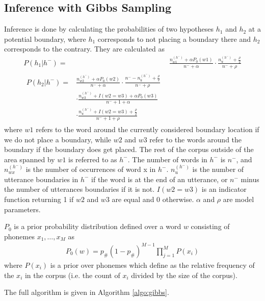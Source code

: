 \documentclass[11pt]{article}
\begin{document}
\subsection{Inference with Gibbs Sampling}
\FloatBarrier
Inference is done by calculating the probabilities of two hypotheses $h_1$ and
$h_2$ at a potential boundary, where $h_1$ corresponds to not placing a
boundary there and $h_2$ corresponds to the contrary.
They are calculated as
\begin{align}
  P(h_1 | h^-) =& \frac{n_{w1}^{(h^-)} + \alpha P_0(w1)}{n^- + \alpha} \cdot
                 \frac{n_u^{(h^-)} + \frac{\rho}{2}}{n^- + \rho}
                  \label{eq:h1} \\
  \begin{split}
  P(h_2 | h^-) =& \frac{n_{w2}^{(h^-)} + \alpha P_0(w2)}{n^- + \alpha}
                  \cdot \frac{n^- - n_\$^{(h^-)} + \frac{\rho}{2}}{n^- + \rho} \\
                & \cdot \frac{n_{w3}^{(h^-)} + I(w2 = w3) + \alpha P_0(w3)}{n^-
                  + 1 + \alpha} \\
                & \cdot \frac{n_u^{(h^-)} + I(w2 = w3) + \frac{\rho}{2}}{n^- + 1 + \rho}
                \label{eq:h2}
  \end{split}
\end{align}
where $w1$ refers to the word around the currently considered boundary location
if we do not place a boundary, while $w2$ and $w3$ refer to the words around the
boundary if the boundary does get placed. The rest of the corpus outside of the
area spanned by $w1$ is referred to as $h^-$. The number of words in $h^-$ is
$n^-$, and $n_{wx}^{(h^-)}$ is the number of occurrences of word x in $h^-$.
$n_u^{(h^-)}$ is the number of utterance boundaries in $h^-$ if the word is at
the end of an utterance, or $n^-$ minus the number of utterances boundaries if
it is not. $I(w2 = w3)$ is an indicator function returning 1 if $w2$ and $w3$
are equal and 0 otherwise. $\alpha$ and $\rho$ are model parameters.

$P_0$ is a prior probability distribution defined over a word $w$ consisting of
phonemes $x_1, \dots, x_M$ as
\begin{align}
  P_0(w) = p_\# (1 - p_\#)^{M-1} \prod_{j=1}^M P(x_i)
\end{align}
where $P(x_i)$ is a prior over phonemes which define as the relative frequency
of the $x_i$ in the corpus (i.e. the count of $x_i$ divided by the size of the corpus).

The full algorithm is given in Algorithm \ref{algo:gibbs}.
\end{document}
